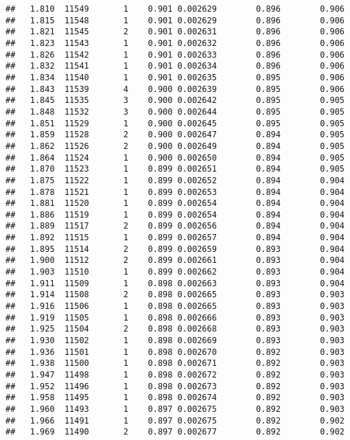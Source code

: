 \documentclass[
]{book}
\begin{document}
\begin{verbatim}
##   1.810  11549       1    0.901 0.002629        0.896        0.906
##   1.815  11548       1    0.901 0.002629        0.896        0.906
##   1.821  11545       2    0.901 0.002631        0.896        0.906
##   1.823  11543       1    0.901 0.002632        0.896        0.906
##   1.826  11542       1    0.901 0.002633        0.896        0.906
##   1.832  11541       1    0.901 0.002634        0.896        0.906
##   1.834  11540       1    0.901 0.002635        0.895        0.906
##   1.843  11539       4    0.900 0.002639        0.895        0.906
##   1.845  11535       3    0.900 0.002642        0.895        0.905
##   1.848  11532       3    0.900 0.002644        0.895        0.905
##   1.851  11529       1    0.900 0.002645        0.895        0.905
##   1.859  11528       2    0.900 0.002647        0.894        0.905
##   1.862  11526       2    0.900 0.002649        0.894        0.905
##   1.864  11524       1    0.900 0.002650        0.894        0.905
##   1.870  11523       1    0.899 0.002651        0.894        0.905
##   1.875  11522       1    0.899 0.002652        0.894        0.904
##   1.878  11521       1    0.899 0.002653        0.894        0.904
##   1.881  11520       1    0.899 0.002654        0.894        0.904
##   1.886  11519       1    0.899 0.002654        0.894        0.904
##   1.889  11517       2    0.899 0.002656        0.894        0.904
##   1.892  11515       1    0.899 0.002657        0.894        0.904
##   1.895  11514       2    0.899 0.002659        0.893        0.904
##   1.900  11512       2    0.899 0.002661        0.893        0.904
##   1.903  11510       1    0.899 0.002662        0.893        0.904
##   1.911  11509       1    0.898 0.002663        0.893        0.904
##   1.914  11508       2    0.898 0.002665        0.893        0.903
##   1.916  11506       1    0.898 0.002665        0.893        0.903
##   1.919  11505       1    0.898 0.002666        0.893        0.903
##   1.925  11504       2    0.898 0.002668        0.893        0.903
##   1.930  11502       1    0.898 0.002669        0.893        0.903
##   1.936  11501       1    0.898 0.002670        0.892        0.903
##   1.938  11500       1    0.898 0.002671        0.892        0.903
##   1.947  11498       1    0.898 0.002672        0.892        0.903
##   1.952  11496       1    0.898 0.002673        0.892        0.903
##   1.958  11495       1    0.898 0.002674        0.892        0.903
##   1.960  11493       1    0.897 0.002675        0.892        0.903
##   1.966  11491       1    0.897 0.002675        0.892        0.902
##   1.969  11490       2    0.897 0.002677        0.892        0.902

\end{verbatim}
\end{document}
